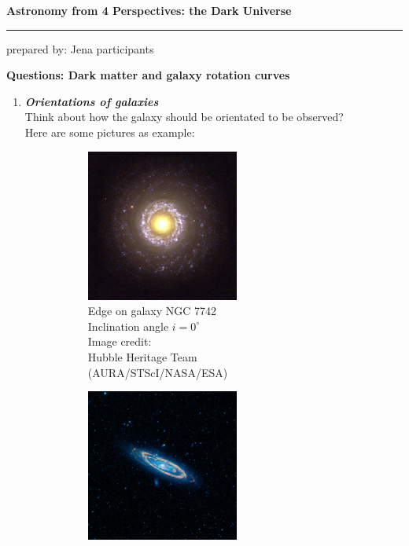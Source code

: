 \documentclass[a4paper,12pt]{article}
\newcommand{\question}[1]{\textbf{\textit{#1}}}
\newcommand{\HRule}{\rule{\linewidth}{0.3mm}}
\begin{document}
\pagestyle{empty}

\begin{center}
\LARGE \textbf{Astronomy from 4 Perspectives: the Dark Universe}
\HRule
\end{center}
\begin{flushright}
prepared by: Jena participants
\end{flushright}
\begin{center}
{\Large \textbf{Questions: Dark matter and galaxy rotation curves}}
\end{center}
\vspace{5mm}



\begin{enumerate}
\item \question{Orientations of galaxies}\\
Think about how the galaxy should be orientated to be observed?\\
Here are some pictures as example:
\begin{figure}[h!]
	\centering
	\begin{subfigure}[t]{0.3\textwidth}
	\includegraphics[height=5cm]{figures/gal1.jpg}
	\caption{Edge on galaxy NGC 7742\\Inclination angle $i =0^\circ$\\Image credit:\\Hubble Heritage Team\\(AURA/STScI/NASA/ESA)}
	\end{subfigure}
	\begin{subfigure}[t]{0.3\textwidth}
	\includegraphics[height=5cm]{figures/gal2.jpg}

\end{subfigure}
\end{figure}
\end{enumerate}
\end{document}
